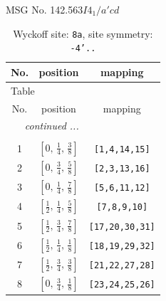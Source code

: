 \documentclass[fleqn,8pt]{jsarticle}
\begin{document}
\setcounter{MaxMatrixCols}{32}

\renewcommand{\tablename}{Table~}
\renewcommand{\figurename}{Figure~}
\begin{center}
\LARGE
MSG No. 142.563\quad$I4_{1}/a'cd$
\end{center}
\renewcommand{\arraystretch}{1.2}
\begin{longtable}{ccc}
\caption{Wyckoff site: {\tt 8a}, site symmetry: {\tt -4'..}}
 \\
 \hline \hline
No. & position & mapping \\ \hline \endfirsthead

\multicolumn{2}{l}{\tablename\ \thetable{}} \\
 \hline \hline
No. & position & mapping \\ \hline \endhead

 \hline \hline
\multicolumn{2}{r}{\footnotesize\it continued ...} \\ \endfoot

 \hline \hline
\multicolumn{2}{r}{} \\ \endlastfoot

1 & $\left[ 0,\, \frac{1}{4},\, \frac{3}{8} \right]$ & {\tt [1,4,14,15]} \\ \hline
2 & $\left[ 0,\, \frac{3}{4},\, \frac{5}{8} \right]$ & {\tt [2,3,13,16]} \\ \hline
3 & $\left[ 0,\, \frac{1}{4},\, \frac{7}{8} \right]$ & {\tt [5,6,11,12]} \\ \hline
4 & $\left[ \frac{1}{2},\, \frac{1}{4},\, \frac{5}{8} \right]$ & {\tt [7,8,9,10]} \\ \hline
5 & $\left[ \frac{1}{2},\, \frac{3}{4},\, \frac{7}{8} \right]$ & {\tt [17,20,30,31]} \\ \hline
6 & $\left[ \frac{1}{2},\, \frac{1}{4},\, \frac{1}{8} \right]$ & {\tt [18,19,29,32]} \\ \hline
7 & $\left[ \frac{1}{2},\, \frac{3}{4},\, \frac{3}{8} \right]$ & {\tt [21,22,27,28]} \\ \hline
8 & $\left[ 0,\, \frac{3}{4},\, \frac{1}{8} \right]$ & {\tt [23,24,25,26]} \\
\end{longtable}
\renewcommand{\arraystretch}{1.2}
\end{document}
